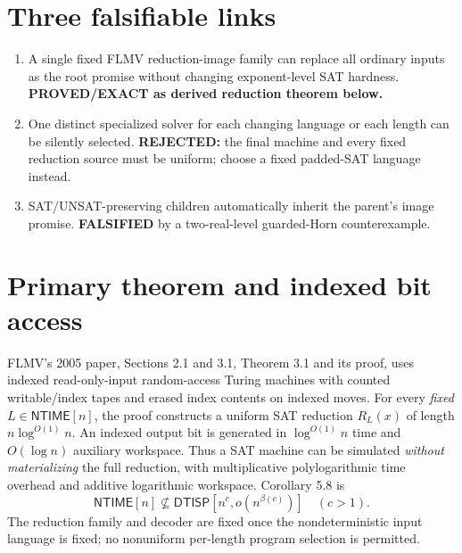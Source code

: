 \documentclass[11pt]{article}
\newcommand{\NTIME}{\mathsf{NTIME}}
\newcommand{\DTISP}{\mathsf{DTISP}}
\begin{document}
\section{Three falsifiable links}
\begin{enumerate}
\item A single fixed FLMV reduction-image family can replace all ordinary inputs as the root promise without changing exponent-level SAT hardness. \textbf{PROVED/EXACT as derived reduction theorem below.}
\item One distinct specialized solver for each changing language or each length can be silently selected. \textbf{REJECTED:} the final machine and every fixed reduction source must be uniform; choose a fixed padded-SAT language instead.
\item SAT/UNSAT-preserving children automatically inherit the parent's image promise. \textbf{FALSIFIED} by a two-real-level guarded-Horn counterexample.
\end{enumerate}
\section{Primary theorem and indexed bit access}
FLMV's 2005 paper, Sections 2.1 and 3.1, Theorem 3.1 and its proof, uses indexed read-only-input random-access Turing machines with counted writable/index tapes and erased index contents on indexed moves. For every \emph{fixed} \(L\in\NTIME[n]\), the proof constructs a uniform SAT reduction \(R_L(x)\) of length \(n\log^{O(1)}n\). An indexed output bit is generated in \(\log^{O(1)}n\) time and \(O(\log n)\) auxiliary workspace. Thus a SAT machine can be simulated \emph{without materializing} the full reduction, with multiplicative polylogarithmic time overhead and additive logarithmic workspace. Corollary 5.8 is
\[
\NTIME[n]\not\subseteq\DTISP[n^c,o(n^{\beta(c)})]
\quad(c>1).
\]
The reduction family and decoder are fixed once the nondeterministic input language is fixed; no nonuniform per-length program selection is permitted.
\end{document}
